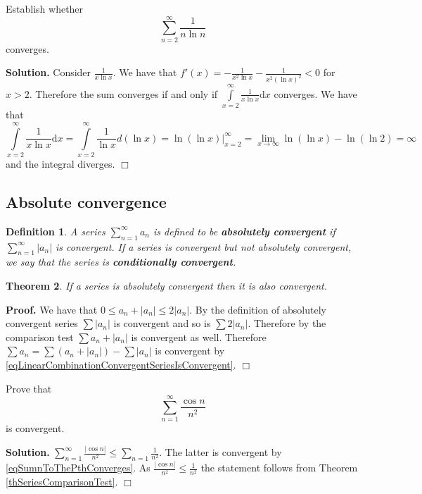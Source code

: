 \documentclass[12pt]{book}
\newcommand{\diff}{\text{d}}
\newenvironment{proof}[1][]{ \textbf{Proof#1.} }{$\Box$\medskip}
\newenvironment{solution}{\textbf{Solution.} }{$\Box$}
\newtheorem{theorem}{Theorem}[section]
\newtheorem{definition}[theorem]{Definition}
\renewcommand{\emph}{\textbf}
\begin{document}
Establish whether
\[ \sum\limits_{n=2}^{\infty}\frac{1}{n\ln n}
\]
converges. 

\begin{solution}
Consider $\frac{1}{x\ln x}$. We have that $\displaystyle f'(x)= -\frac{1}{x^2\ln x}- \frac{1}{x^2(\ln x)^2}<0$ for $x>2$. Therefore the sum converges if and only if $\int\limits_{x=2}^{\infty}\frac{1}{x\ln x}\diff x$ converges. We have that
\[ \int\limits_{x=2}^{\infty}\frac{1}{x\ln x}\diff x= \int\limits_{x=2}^\infty \frac{1}{\ln x}d(\ln x) = \left.\ln (\ln x)\right|_{x=2}^{\infty}= \lim\limits_{x\to \infty} \ln (\ln x ) - \ln (\ln 2)=\infty
\]
and the integral diverges.
\end{solution}

\subsection{Absolute convergence}
\begin{definition}
A series $\sum_{n=1}^\infty a_n$ is defined to be \emph{absolutely convergent} if $\sum_{n=1}^\infty |a_n|$ is convergent.  If a series is convergent but not absolutely convergent, we say that the series is \emph{conditionally convergent}. 
\end{definition}

\begin{theorem} \label{thAbsoluteConvergenceImpliesConvergence}
If a series is absolutely convergent then it is also convergent. 
\end{theorem}

\begin{proof}
We have that $0\leq a_n+|a_n|\leq 2|a_n|$. By the definition of absolutely convergent series $\sum |a_n|$ is convergent and so is $\sum 2|a_n|$. Therefore by the comparison test $\sum a_n+|a_n|$ is convergent as well. Therefore $\sum a_n= \sum (a_n+|a_n|)-\sum |a_n|$  is convergent by \eqref{eqLinearCombinationConvergentSeriesIsConvergent}.
\end{proof}

Prove that 
\[
\sum_{n=1}^{\infty} \frac{\cos n}{n^2}
\]
is convergent.

\begin{solution}
$\sum\limits_{n=1}^{\infty} \frac{|\cos n |}{n^2} \leq \sum\limits_{n=1}\frac{1}{n^2}$. The latter is convergent by \eqref{eqSumnToThePthConverges}. As $\frac{|\cos n|}{n^2}\leq \frac{1}{n^2}$ the statement follows from Theorem \ref{thSeriesComparisonTest}.
\end{solution}
\end{document}
